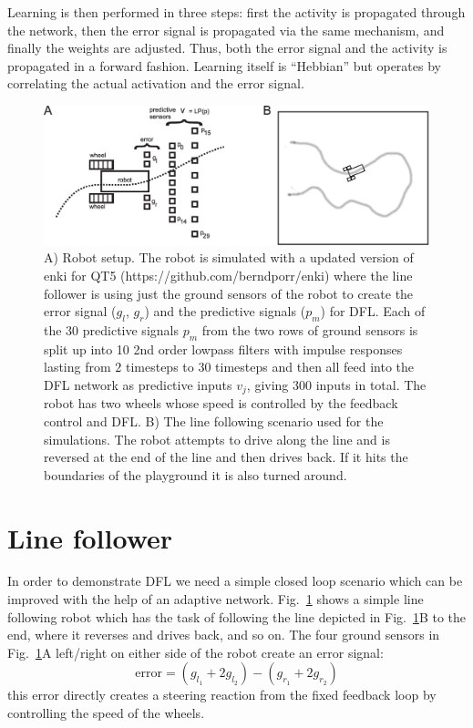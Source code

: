 \documentclass{llncs}
\begin{document}
Learning is then performed in three steps: first the activity is
propagated through the network, then the error signal is propagated
via the same mechanism, and finally the weights are adjusted. Thus,
both the error signal and the activity is propagated in a forward
fashion.  Learning itself is ``Hebbian'' but operates by correlating
the actual activation and the error signal.

\begin{figure}[h!]
  \centering
  \includegraphics[width=\columnwidth]{linefollower_robot_playground}
  \caption{A) Robot setup. The robot is simulated with a updated
    version of enki for QT5 (https://github.com/berndporr/enki)
    where the line follower is using just the ground sensors of the
    robot to create the error signal ($g_l$, $g_r$) and the predictive signals ($p_m$)
    for DFL. Each of the 30 predictive signals $p_m$ from the two rows of ground sensors
    is split up into 10 2nd order lowpass filters with impulse responses
    lasting from $2$ timesteps to $30$ timesteps and then all feed into the DFL
    network as predictive inputs $v_j$, giving 300 inputs in total.
    The robot has two wheels whose speed is controlled
    by the feedback control and DFL.
    B) The line following scenario used for the simulations. The robot
    attempts to drive along the line and is reversed at the end of the
    line and then drives back. If it hits the boundaries of the playground
    it is also turned around.
    \label{linefollower_robot_playground}}
\end{figure}




\section{Line follower}
In order to demonstrate DFL we need a simple closed loop scenario
which can be improved with the help of an adaptive network.
Fig.~\ref{linefollower_robot_playground} shows a simple line following
robot which has the task of following the line depicted in
Fig.~\ref{linefollower_robot_playground}B to the end, where it
reverses and drives back, and so on. The four ground sensors in
Fig.~\ref{linefollower_robot_playground}A left/right on either side
of the robot create an error signal:
\begin{equation}
\mathrm{error} = (g_{l_1}+2 g_{l_2})-(g_{r_1}+2 g_{r_2}) \label{line_error}
\end{equation}
this error directly creates a steering reaction from the fixed
feedback loop by controlling the speed of the wheels.
\end{document}
